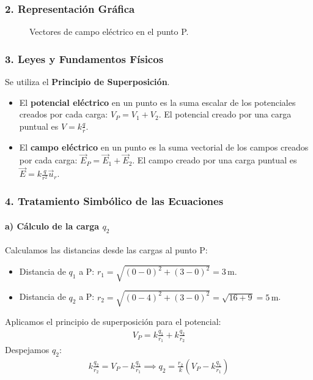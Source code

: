\subsubsection*{2. Representación Gráfica}
\begin{figure}[H]
    \centering
    \caption{Vectores de campo eléctrico en el punto P.}
\end{figure}

\subsubsection*{3. Leyes y Fundamentos Físicos}
Se utiliza el \textbf{Principio de Superposición}.
\begin{itemize}
    \item El \textbf{potencial eléctrico} en un punto es la suma escalar de los potenciales creados por cada carga: $V_P = V_1 + V_2$. El potencial creado por una carga puntual es $V=k\frac{q}{r}$.
    \item El \textbf{campo eléctrico} en un punto es la suma vectorial de los campos creados por cada carga: $\vec{E}_P = \vec{E}_1 + \vec{E}_2$. El campo creado por una carga puntual es $\vec{E}=k\frac{q}{r^2}\vec{u}_r$.
\end{itemize}

\subsubsection*{4. Tratamiento Simbólico de las Ecuaciones}
\paragraph*{a) Cálculo de la carga $q_2$}
Calculamos las distancias desde las cargas al punto P:
\begin{itemize}
    \item Distancia de $q_1$ a P: $r_1 = \sqrt{(0-0)^2 + (3-0)^2} = 3\,\text{m}$.
    \item Distancia de $q_2$ a P: $r_2 = \sqrt{(0-4)^2 + (3-0)^2} = \sqrt{16+9} = 5\,\text{m}$.
\end{itemize}
Aplicamos el principio de superposición para el potencial:
\begin{gather}
    V_P = k\frac{q_1}{r_1} + k\frac{q_2}{r_2}
\end{gather}
Despejamos $q_2$:
\begin{gather}
    k\frac{q_2}{r_2} = V_P - k\frac{q_1}{r_1} \implies q_2 = \frac{r_2}{k}\left(V_P - k\frac{q_1}{r_1}\right)
\end{gather}

